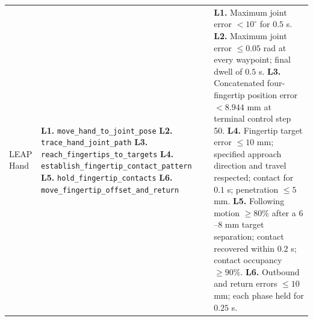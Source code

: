 \begin{longtable}{@{}>{\raggedright\arraybackslash}p{}
                        >{\raggedright\arraybackslash}p{}
                        >{\raggedright\arraybackslash}p{}@{}}
LEAP Hand
&
\textbf{L1.} \texttt{move\_hand\_to\_joint\_pose}\newline
\textbf{L2.} \texttt{trace\_hand\_joint\_path}\newline
\textbf{L3.} \texttt{reach\_fingertips\_to\_targets}\newline
\textbf{L4.} \texttt{establish\_fingertip\_contact\_pattern}\newline
\textbf{L5.} \texttt{hold\_fingertip\_contacts}\newline
\textbf{L6.} \texttt{move\_fingertip\_offset\_and\_return}
&
\textbf{L1.} Maximum joint error $<10^{\circ}$ for $0.5$ s.\newline
\textbf{L2.} Maximum joint error $\leq 0.05$ rad at every waypoint;
final dwell of $0.5$ s.\newline
\textbf{L3.} Concatenated four-fingertip position error $<8.944$ mm at
terminal control step 50.\newline
\textbf{L4.} Fingertip target error $\leq 10$ mm; specified approach
direction and travel respected; contact for $0.1$ s; penetration
$\leq 5$ mm.\newline
\textbf{L5.} Following motion $\geq 80\%$ after a $6$--$8$ mm target
separation; contact recovered within $0.2$ s; contact occupancy
$\geq 90\%$.\newline
\textbf{L6.} Outbound and return errors $\leq 10$ mm; each phase held
for $0.25$ s.
\\[3pt]


\end{longtable}
